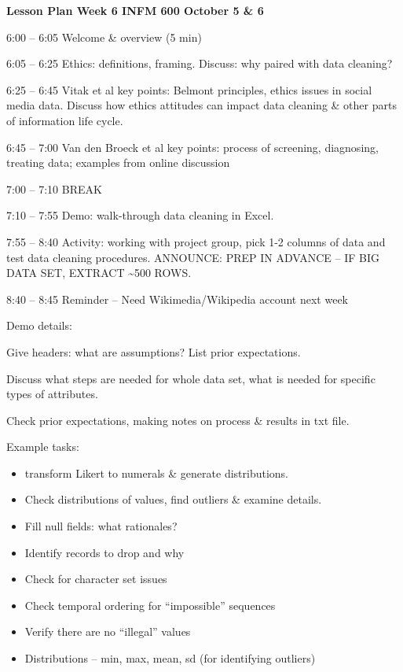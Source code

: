 \documentclass[]{article}
\date{}
\begin{document}
\textbf{Lesson Plan Week 6 INFM 600 October 5 \& 6}

6:00 -- 6:05 Welcome \& overview (5 min)

6:05 -- 6:25 Ethics: definitions, framing. Discuss: why paired with data
cleaning?

6:25 -- 6:45 Vitak et al key points: Belmont principles, ethics issues
in social media data. Discuss how ethics attitudes can impact data
cleaning \& other parts of information life cycle.

6:45 -- 7:00 Van den Broeck et al key points: process of screening,
diagnosing, treating data; examples from online discussion

7:00 -- 7:10 BREAK

7:10 -- 7:55 Demo: walk-through data cleaning in Excel.

7:55 -- 8:40 Activity: working with project group, pick 1-2 columns of
data and test data cleaning procedures. ANNOUNCE: PREP IN ADVANCE -- IF
BIG DATA SET, EXTRACT \textasciitilde{}500 ROWS.

8:40 -- 8:45 Reminder -- Need Wikimedia/Wikipedia account next week

Demo details:

Give headers: what are assumptions? List prior expectations.

Discuss what steps are needed for whole data set, what is needed for
specific types of attributes.

Check prior expectations, making notes on process \& results in txt
file.

Example tasks:

\begin{itemize}
\item
  transform Likert to numerals \& generate distributions.
\item
  Check distributions of values, find outliers \& examine details.
\item
  Fill null fields: what rationales?
\item
  Identify records to drop and why
\item
  Check for character set issues
\item
  Check temporal ordering for ``impossible'' sequences
\item
  Verify there are no ``illegal'' values
\item
  Distributions -- min, max, mean, sd (for identifying outliers)
\end{itemize}
\end{document}
